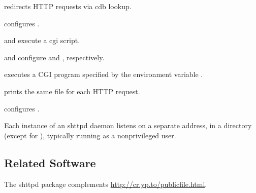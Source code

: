 \documentclass{book}
\begin{document}
 redirects HTTP requests via cdb lookup.

 configures .

 and  execute a cgi script.

 and  configure  and
, respectively.

 executes a CGI program specified by the environment variable
.

 prints the same file for each HTTP request.

 configures .

Each instance of an shttpd daemon listens on a separate address, in a
 directory (except for ), typically running as a
nonprivileged user.

\subsection{Related Software}
The shttpd package complements \href{publicfile}{http://cr.yp.to/publicfile.html}.
\end{document}

